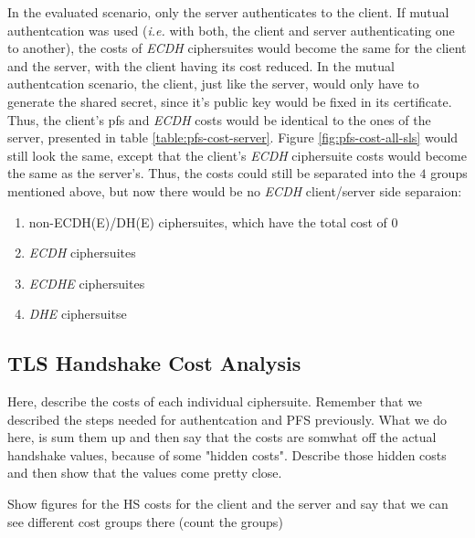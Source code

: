 \documentclass{llncs}
\begin{document}
In the evaluated scenario, only the server authenticates to the client. If mutual authentcation was used (\textit{i.e.} with both, the client 
and server authenticating one to another), the costs of \textit{ECDH} ciphersuites would become the same for the client and the server, with the client
having its cost reduced. In the mutual authentcation scenario, the client, just like the server, would only have to generate the shared secret, since
it's public key would be fixed in its certificate. Thus, the client's \gls{pfs} and \textit{ECDH} costs would be identical to the ones of the server,
presented in table \ref{table:pfs-cost-server}. Figure \ref{fig:pfs-cost-all-sls} would still look the same, except that the client's \textit{ECDH}
ciphersuite costs would become the same as the server's. Thus, the costs could still be separated into the $4$ groups mentioned above, 
but now there would be no \textit{ECDH} client/server side separaion:

\begin{enumerate}
  \item non-ECDH(E)/DH(E) ciphersuites, which have the total cost of $0$
  \item \textit{ECDH} ciphersuites
  \item \textit{ECDHE} ciphersuites
  \item \textit{DHE} ciphersuitse
\end{enumerate}

\subsection{TLS Handshake Cost Analysis}

Here, describe the costs of each individual ciphersuite. Remember that we described the steps needed for authentcation and PFS previously.
What we do here, is sum them up and then say that the costs are somwhat off the actual handshake values, because of some "hidden costs".
Describe those hidden costs and then show that the values come pretty close.

Show figures for the HS costs for the client and the server and say that we can see different cost groups there (count the groups)
\end{document}
